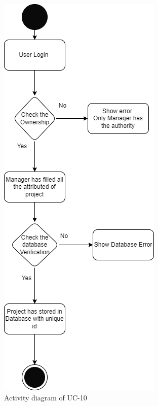 \begin{figure}[H]
    \centering
    \includegraphics[scale=0.7]{./diagrams/Activity Diagram/ad-10.png}
    \caption{Activity diagram of UC-10}
    \label{fig:act-10}

\end{figure}


